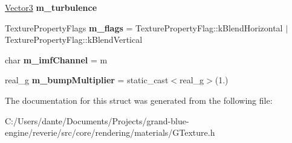 \begin{DoxyCompactItemize}
\mbox{\hyperlink{classrev_1_1_vector}{Vector3}} {\bfseries m\+\_\+turbulence}
\item 
\mbox{\label{structrev_1_1_texture_properties_aafea1b3a46e9be0303d8becc4423bf14}} 
Texture\+Property\+Flags {\bfseries m\+\_\+flags} = Texture\+Property\+Flag\+::k\+Blend\+Horizontal $\vert$ Texture\+Property\+Flag\+::k\+Blend\+Vertical
\item 
\mbox{\label{structrev_1_1_texture_properties_af9cc69a2ba1a57de7fca4f7cec8cafd6}} 
char {\bfseries m\+\_\+imf\+Channel} = \textquotesingle{}m\textquotesingle{}
\item 
\mbox{\label{structrev_1_1_texture_properties_a6f5e3bcedecdf405ae19a7c8008d5478}} 
real\+\_\+g {\bfseries m\+\_\+bump\+Multiplier} = static\+\_\+cast$<$real\+\_\+g$>$(1.)
\end{DoxyCompactItemize}


The documentation for this struct was generated from the following file\+:\begin{DoxyCompactItemize}
\item 
C\+:/\+Users/dante/\+Documents/\+Projects/grand-\/blue-\/engine/reverie/src/core/rendering/materials/G\+Texture.\+h\end{DoxyCompactItemize}
